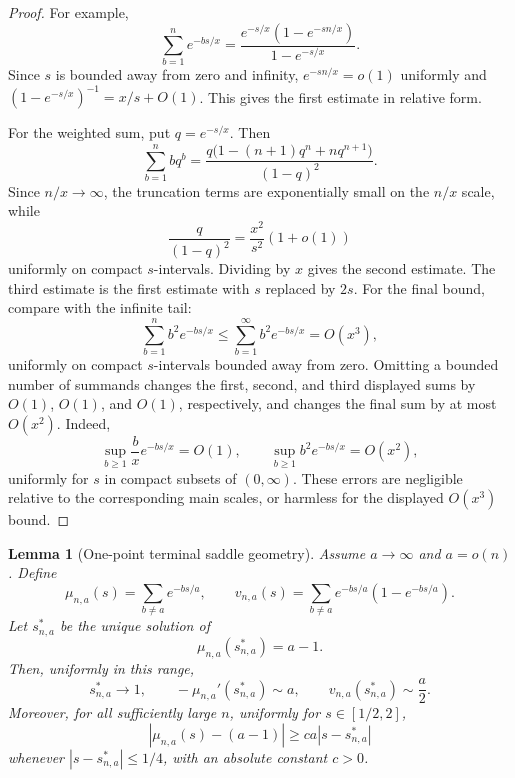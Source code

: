 \documentclass[11pt]{article}
\newtheorem{lemma}[theorem]{Lemma}
\theoremstyle{remark}
\begin{document}
\begin{proof}
For example,
\[
        \sum_{b=1}^n e^{-bs/x}
        =\frac{e^{-s/x}(1-e^{-sn/x})}{1-e^{-s/x}}.
\]
Since \(s\) is bounded away from zero and infinity, \(e^{-sn/x}=o(1)\) uniformly and \((1-e^{-s/x})^{-1}=x/s+O(1)\).  This gives the first estimate in relative form.

For the weighted sum, put \(q=e^{-s/x}\).  Then
\[
        \sum_{b=1}^n bq^b
        =
        \frac{q\bigl(1-(n+1)q^n+nq^{n+1}\bigr)}{(1-q)^2}.
\]
Since \(n/x\to\infty\), the truncation terms are exponentially small on the \(n/x\) scale, while
\[
        \frac{q}{(1-q)^2}=\frac{x^2}{s^2}(1+o(1))
\]
uniformly on compact \(s\)-intervals.  Dividing by \(x\) gives the second estimate.  The third estimate is the first estimate with \(s\) replaced by \(2s\).  For the final bound, compare with the infinite tail:
\[
        \sum_{b=1}^n b^2e^{-bs/x}\le \sum_{b=1}^{\infty}b^2e^{-bs/x}=O(x^3),
\]
uniformly on compact \(s\)-intervals bounded away from zero.  Omitting a bounded number of summands changes the first, second, and third displayed sums by \(O(1)\), \(O(1)\), and \(O(1)\), respectively, and changes the final sum by at most \(O(x^2)\).  Indeed,
\[
        \sup_{b\ge1}\frac{b}{x}e^{-bs/x}=O(1),
        \qquad
        \sup_{b\ge1}b^2e^{-bs/x}=O(x^2),
\]
uniformly for \(s\) in compact subsets of \((0,\infty)\).  These errors are negligible relative to the corresponding main scales, or harmless for the displayed \(O(x^3)\) bound.
\end{proof}

\begin{lemma}[One-point terminal saddle geometry]\label{lem:suk-one-saddle}
Assume \(a\to\infty\) and \(a=o(n)\).  Define
\[
        \mu_{n,a}(s)=\sum_{b\ne a}e^{-bs/a},
        \qquad
        v_{n,a}(s)=\sum_{b\ne a}e^{-bs/a}(1-e^{-bs/a}).
\]
Let \(s_{n,a}^*\) be the unique solution of
\[
        \mu_{n,a}(s_{n,a}^*)=a-1.
\]
Then, uniformly in this range,
\[
        s_{n,a}^*\to1,
        \qquad
        -\mu_{n,a}'(s_{n,a}^*)\sim a,
        \qquad
        v_{n,a}(s_{n,a}^*)\sim \frac a2 .
\]
Moreover, for all sufficiently large \(n\), uniformly for \(s\in[1/2,2]\),
\[
        |\mu_{n,a}(s)-(a-1)|\ge c a |s-s_{n,a}^*|
\]
whenever \(|s-s_{n,a}^*|\le 1/4\), with an absolute constant \(c>0\).
\end{lemma}
\end{document}
